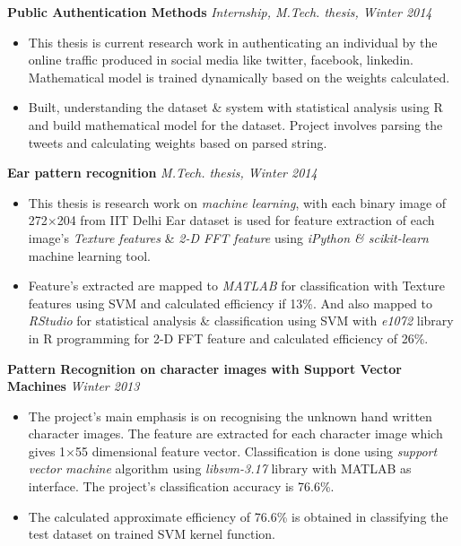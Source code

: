 \documentclass[9pt]{article}
\newenvironment{changemargin}[2]{%
  \begin{list}{}{%
    \setlength{\topsep}{0pt}%
    \setlength{\leftmargin}{#1}%
    \setlength{\rightmargin}{#2}%
    \setlength{\listparindent}{\parindent}%
    \setlength{\itemindent}{\parindent}%
    \setlength{\parsep}{\parskip}%
  }%
  \item[]}{\end{list}
}
\newenvironment{body} {
	\vspace*{-16pt}
	\begin{changemargin}{-0.25in}{-0.5in}
  }	
	{\end{changemargin}
}
\begin{document}
\begin{body}
	\vspace{14pt}
	\textbf{Public Authentication Methods} \hfill \emph{Internship, M.Tech. thesis, Winter 2014}\\
	
	\begin{itemize}
		\item This thesis is current research work in authenticating an individual by the online traffic produced in social media like twitter, facebook, linkedin. Mathematical model is trained dynamically based on the weights calculated.
		\item Built, understanding the dataset \& system with statistical analysis using R and build mathematical model for the dataset. Project involves parsing the tweets and calculating weights based on parsed string.
	\end{itemize}
	\medskip
	
	\textbf{Ear pattern recognition} \hfill \emph{M.Tech. thesis, Winter 2014}\\
	
	\begin{itemize}
		\item This thesis is research work on \textit{machine learning}, with each binary image of 272$\times$204 from IIT Delhi Ear dataset is used for feature extraction of each image's \textit{Texture features} \& \textit{2-D FFT feature} using \textit{iPython \& scikit-learn} machine learning tool.
		\item Feature's extracted are mapped to \textit{MATLAB} for classification with Texture features using SVM and calculated efficiency if 13\%. And also mapped to \textit{RStudio} for statistical analysis \& classification using SVM with \textit{e1072} library in R programming for 2-D FFT feature and calculated efficiency of 26\%.
	\end{itemize}
	\medskip
	
	\textbf{Pattern Recognition on character images with Support Vector Machines} \hfill \emph{Winter 2013}\\
	
	\begin{itemize} 
		\item The project's main emphasis is on recognising the unknown hand written character images. The feature are extracted for each character image which gives 1$\times$55 dimensional feature vector. Classification is done using \emph{support vector machine} algorithm using \emph{libsvm-3.17} library with MATLAB as interface. The project's classification accuracy is 76.6\%.
		\item The calculated approximate efficiency of 76.6\% is obtained in classifying the test dataset on trained SVM kernel function.
	\end{itemize}
\medskip


\end{body}
\end{document}
